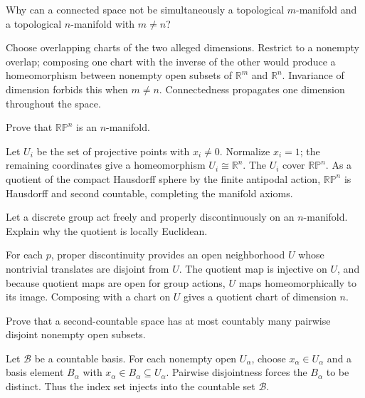 \begin{problem}\label{prob:vii01-07}
Why can a connected space not be simultaneously a topological \(m\)-manifold and a topological \(n\)-manifold with \(m\neq n\)?
\end{problem}
\begin{solution}
Choose overlapping charts of the two alleged dimensions.  Restrict to a nonempty overlap; composing one chart with the inverse of the other would produce a homeomorphism between nonempty open subsets of \(\mathbb R^m\) and \(\mathbb R^n\).  Invariance of dimension forbids this when \(m\neq n\).  Connectedness propagates one dimension throughout the space.
\end{solution}

\begin{problem}\label{prob:vii01-08}
Prove that \(\mathbb{RP}^n\) is an \(n\)-manifold.
\end{problem}
\begin{solution}
Let \(U_i\) be the set of projective points with \(x_i\neq0\).  Normalize \(x_i=1\); the remaining coordinates give a homeomorphism \(U_i\cong\mathbb R^n\).  The \(U_i\) cover \(\mathbb{RP}^n\).  As a quotient of the compact Hausdorff sphere by the finite antipodal action, \(\mathbb{RP}^n\) is Hausdorff and second countable, completing the manifold axioms.
\end{solution}

\begin{problem}\label{prob:vii01-09}
Let a discrete group act freely and properly discontinuously on an \(n\)-manifold.  Explain why the quotient is locally Euclidean.
\end{problem}
\begin{solution}
For each \(p\), proper discontinuity provides an open neighborhood \(U\) whose nontrivial translates are disjoint from \(U\).  The quotient map is injective on \(U\), and because quotient maps are open for group actions, \(U\) maps homeomorphically to its image.  Composing with a chart on \(U\) gives a quotient chart of dimension \(n\).
\end{solution}

\begin{problem}\label{prob:vii01-10}
Prove that a second-countable space has at most countably many pairwise disjoint nonempty open subsets.
\end{problem}
\begin{solution}
Let \(\mathcal B\) be a countable basis.  For each nonempty open \(U_\alpha\), choose \(x_\alpha\in U_\alpha\) and a basis element \(B_\alpha\) with \(x_\alpha\in B_\alpha\subseteq U_\alpha\).  Pairwise disjointness forces the \(B_\alpha\) to be distinct.  Thus the index set injects into the countable set \(\mathcal B\).
\end{solution}

